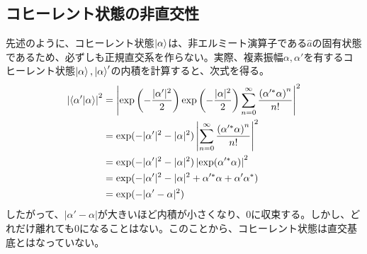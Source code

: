 \subsection{コヒーレント状態の非直交性}
先述のように、コヒーレント状態$\ket \alpha$は、非エルミート演算子である$\hat a$の固有状態であるため、必ずしも正規直交系を作らない。実際、複素振幅$\alpha, \alpha'$を有するコヒーレント状態$\ket \alpha, \ket \alpha'$の内積を計算すると、次式を得る。
\begin{equation}
\begin{aligned}
  \left| \braket{\alpha'|\alpha}\right|^2 &= \left| \exp\left(-\frac{|\alpha'|^2}{2}\right)\exp\left(-\frac{|\alpha|^2}{2}\right)\sum_{n = 0}^\infty \frac{\left(\alpha'^*\alpha\right)^n}{n!} \right|^2\\
  &=\exp(-|\alpha'|^2 - |\alpha|^2)\left|
  \sum_{n=0}^\infty \frac{\left(\alpha'^*\alpha\right)^n}{n!}
  \right|^2\\
  &=\exp(-|\alpha'|^2 - |\alpha|^2)\left|\exp(\alpha'^*\alpha)
  \right|^2\\
  &= \exp(-|\alpha'|^2 - |\alpha|^2 + \alpha'^*\alpha +\alpha'\alpha^*)\\
  &= \exp(-|\alpha' - \alpha|^2)
\end{aligned}
\end{equation}
したがって、$|\alpha' - \alpha|$が大きいほど内積が小さくなり、0に収束する。しかし、どれだけ離れても0になることはない。このことから、コヒーレント状態は直交基底とはなっていない。

